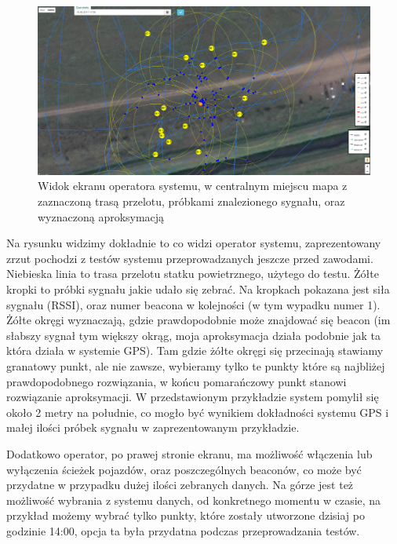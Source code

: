 \begin{figure}[!th]
    \centering
    \includegraphics[width=15cm]{zalaczniki/obrazy/klient.png}
    \caption{Widok ekranu operatora systemu, w centralnym miejscu mapa z zaznaczoną trasą przelotu, próbkami znalezionego sygnału, oraz wyznaczoną aproksymacją}
    \label{fig:klient}
\end{figure}

Na rysunku widzimy dokładnie to co widzi operator systemu, zaprezentowany zrzut pochodzi z testów systemu przeprowadzanych jeszcze przed zawodami. Niebieska linia to trasa przelotu statku powietrznego, użytego do testu. Żółte kropki to próbki sygnału jakie udało się zebrać. Na kropkach pokazana jest siła sygnału (RSSI), oraz numer beacona w kolejności (w tym wypadku numer 1). Żółte okręgi wyznaczają, gdzie prawdopodobnie może znajdować się beacon (im słabszy sygnał tym większy okrąg, moja aproksymacja działa podobnie jak ta która działa w systemie GPS). Tam gdzie żółte okręgi się przecinają stawiamy granatowy punkt, ale nie zawsze, wybieramy tylko te punkty które są najbliżej prawdopodobnego rozwiązania, w końcu pomarańczowy punkt stanowi rozwiązanie aproksymacji. W przedstawionym przykładzie system pomylił się około 2 metry na południe, co mogło być wynikiem dokładności systemu GPS i małej ilości próbek sygnału w zaprezentowanym przykładzie.

Dodatkowo operator, po prawej stronie ekranu, ma możliwość włączenia lub wyłączenia ścieżek pojazdów, oraz poszczególnych beaconów, co może być przydatne w przypadku dużej ilości zebranych danych. Na górze jest też możliwość wybrania z systemu danych, od konkretnego momentu w czasie, na przykład możemy wybrać tylko punkty, które zostały utworzone dzisiaj po godzinie 14:00, opcja ta była przydatna podczas przeprowadzania testów.

